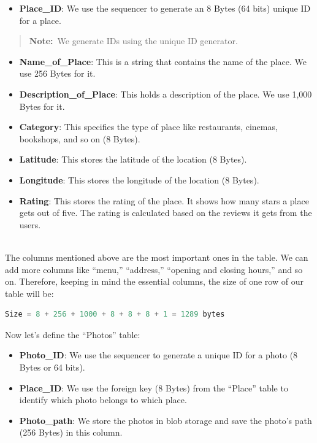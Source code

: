 \begin{itemize}
\item
\protect{}\label{7gimEx9hB33VI8vEvIcMv}
\textbf{Place\_ID}: We use the sequencer to generate an 8 Bytes (64 bits) unique ID for a place.
\end{itemize}
\begin{quote}
\textbf{Note:}~We generate IDs using the unique ID generator.
\end{quote}
\begin{itemize}
\item
\protect{}\label{Kz0Dhe-o2wSe1aCefw86A}
\textbf{Name\_of\_Place}: This is a string that contains the name of the place. We use 256 Bytes for it.
\item
\protect{}\label{MYVVj0QtL69h3ZAH_58NR}
\textbf{Description\_of\_Place}: This holds a description of the place. We use 1,000 Bytes for it.
\item
\protect{}\label{IaBYZTbgKXcsByRgd5dKG}
\textbf{Category}: This specifies the type of place like restaurants, cinemas, bookshops, and so on (8 Bytes).
\item
\protect{}\label{vPj8RCrgR3Io6ER72ck3C}
\textbf{Latitude}: This stores the latitude of the location (8 Bytes).
\item
\protect{}\label{g8cuT1I_-EkX1CkOir3Sn}
\textbf{Longitude}: This stores the longitude of the location (8 Bytes).
\item
\protect{}\label{UstnpBzayge0odONQehPk}
\textbf{Rating}: This stores the rating of the place. It shows how many stars a place gets out of five. The rating is calculated based on the reviews it gets from the users.
\end{itemize}
\\
The columns mentioned above are the most important ones in the table. We can add more columns like ``menu,'' ``address,'' ``opening and closing hours,'' and so on. Therefore, keeping in mind the essential columns, the size of one row of our table will be:

\begin{lstlisting}[language=JavaScript]
Size = 8 + 256 + 1000 + 8 + 8 + 8 + 1 = 1289 bytes
\end{lstlisting}

Now let's define the ``Photos'' table:

\begin{itemize}
\item
\protect{}\label{5-WTF3QtS-ISgFm47mO5Y}
\textbf{Photo\_ID}: We use the sequencer to generate a unique ID for a photo (8 Bytes or 64 bits).
\item
\protect{}\label{KQnaoXkAHrgQximObjUMt}
\textbf{Place\_ID}: We use the foreign key (8 Bytes) from the ``Place'' table to identify which photo belongs to which place.
\item
\protect{}\label{bCTNRCcSEq_4yxwvqAQ79}
\textbf{Photo\_path}: We store the photos in blob storage and save the photo's path (256 Bytes) in this column.
\end{itemize}

